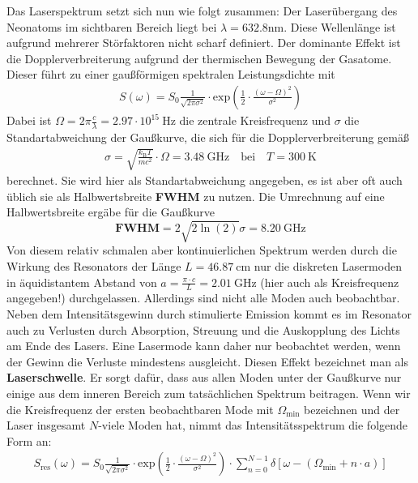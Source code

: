 \documentclass[german,  %
parskip=full,  %
]{scrartcl}
\begin{document}
Das Laserspektrum setzt sich nun wie folgt zusammen: Der Laserübergang des Neonatoms im sichtbaren Bereich liegt bei \(\lambda = 632.8 \mathrm{nm}\). Diese Wellenlänge ist aufgrund mehrerer Störfaktoren nicht scharf definiert. Der dominante Effekt ist die Dopplerverbreiterung aufgrund der thermischen Bewegung der Gasatome. Dieser führt zu einer gaußförmigen spektralen Leistungsdichte mit
\begin{align}
S(\omega) = S_0 \frac{1}{\sqrt{2\pi\sigma^2}}\cdot\mathrm{exp}\left(\frac{1}{2}\cdot\frac{(\omega-\Omega)^2}{\sigma^2}\right)
\end{align}
Dabei ist \(\Omega = 2\pi \frac{c}{\lambda} = 2.97\cdot 10^{15} \ \mathrm{Hz} \) die zentrale Kreisfrequenz und \(\sigma\) die Standartabweichung der Gaußkurve, die sich für die Dopplerverbreiterung gemäß
\begin{align*}
\sigma = \sqrt{\frac{k_{\mathrm{B}}T}{mc^2}} \cdot \Omega = 3.48 \ \mathrm{GHz} \quad\text{bei}\quad T=300 \ \mathrm{K}
\end{align*}
berechnet. Sie wird hier als Standartabweichung angegeben, es ist aber oft auch üblich sie als Halbwertsbreite \textbf{FWHM} zu nutzen. Die Umrechnung auf eine Halbwertsbreite ergäbe für die Gaußkurve
\[\textbf{FWHM} = 2\sqrt{2\ln(2)}\sigma = 8.20 \ \mathrm{GHz}\]
Von diesem relativ schmalen aber kontinuierlichen Spektrum werden durch die Wirkung des Resonators der Länge \(L=46.87 \ \mathrm{cm}\) nur die diskreten Lasermoden in äquidistantem Abstand von \(a = \frac{\pi\cdot c}{L} = 2.01 \ \mathrm{GHz}\) (hier auch als Kreisfrequenz angegeben!) durchgelassen. Allerdings sind nicht alle Moden auch beobachtbar. Neben dem Intensitätsgewinn durch stimulierte Emission kommt es im Resonator auch zu Verlusten durch Absorption, Streuung und die Auskopplung des Lichts am Ende des Lasers. Eine Lasermode kann daher nur beobachtet werden, wenn der Gewinn die Verluste mindestens ausgleicht. Diesen Effekt bezeichnet man als \textbf{Laserschwelle}. Er sorgt dafür, dass aus allen Moden unter der Gaußkurve nur einige aus dem inneren Bereich zum tatsächlichen Spektrum beitragen. Wenn wir die Kreisfrequenz der ersten beobachtbaren Mode mit \(\Omega_{\mathrm{min}}\) bezeichnen und der Laser insgesamt \(N\)-viele Moden hat, nimmt das Intensitätsspektrum die folgende Form an: 
\begin{align}
S_{\mathrm{res}}(\omega) =  S_0 \frac{1}{\sqrt{2\pi\sigma^2}}\cdot\mathrm{exp}\left(\frac{1}{2}\cdot\frac{(\omega-\Omega)^2}{\sigma^2}\right) \cdot\sum_{n = 0}^{N-1} \delta\left[\omega - \left(\Omega_{\mathrm{min}} + n\cdot a\right)\right]
\end{align}
\end{document}
